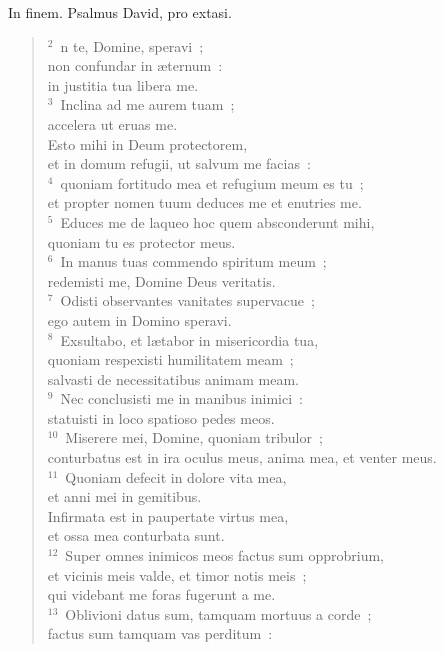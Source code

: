 \bchapter[Psalm]
In finem. Psalmus David, pro extasi.
\begin{verse}${}^{2}$~n te, Domine, speravi~;\\ non confundar in \ae ternum~:\\ in justitia tua libera me.\\
${}^{3}$~Inclina ad me aurem tuam~;\\ accelera ut eruas me.\\ Esto mihi in Deum protectorem,\\ et in domum refugii, ut salvum me facias~:\\
${}^{4}$~quoniam fortitudo mea et refugium meum es tu~;\\ et propter nomen tuum deduces me et enutries me.\\
${}^{5}$~Educes me de laqueo hoc quem absconderunt mihi,\\ quoniam tu es protector meus.\\
${}^{6}$~In manus tuas commendo spiritum meum~;\\ redemisti me, Domine Deus veritatis.\\
${}^{7}$~Odisti observantes vanitates supervacue~;\\ ego autem in Domino speravi.\\
${}^{8}$~Exsultabo, et l\ae tabor in misericordia tua,\\ quoniam respexisti humilitatem meam~;\\ salvasti de necessitatibus animam meam.\\
${}^{9}$~Nec conclusisti me in manibus inimici~:\\ statuisti in loco spatioso pedes meos.\\
${}^{10}$~Miserere mei, Domine, quoniam tribulor~;\\ conturbatus est in ira oculus meus, anima mea, et venter meus.\\
${}^{11}$~Quoniam defecit in dolore vita mea,\\ et anni mei in gemitibus.\\ Infirmata est in paupertate virtus mea,\\ et ossa mea conturbata sunt.\\
${}^{12}$~Super omnes inimicos meos factus sum opprobrium,\\ et vicinis meis valde, et timor notis meis~;\\ qui videbant me foras fugerunt a me.\\
${}^{13}$~Oblivioni datus sum, tamquam mortuus a corde~;\\ factus sum tamquam vas perditum~:\\

\end{verse}
